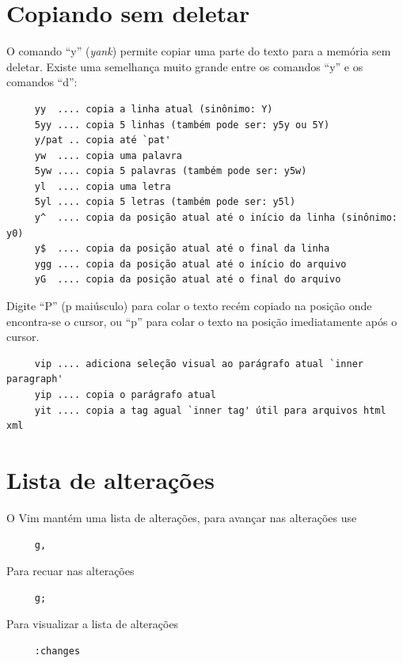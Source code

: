 \documentclass[10pt,a4paper,openany]{book}
\begin{document}
\section{Copiando sem deletar}\label{Copiando sem deletar}

O comando ``y'' ({\em yank}) permite copiar uma parte do texto para a memória sem deletar.
Existe uma semelhança muito grande entre os comandos ``y'' e os comandos ``d'':

\begin{verbatim}
     yy  .... copia a linha atual (sinônimo: Y)
     5yy .... copia 5 linhas (também pode ser: y5y ou 5Y)
     y/pat .. copia até `pat'
     yw  .... copia uma palavra
     5yw .... copia 5 palavras (também pode ser: y5w)
     yl  .... copia uma letra
     5yl .... copia 5 letras (também pode ser: y5l)
     y^  .... copia da posição atual até o início da linha (sinônimo: y0)
     y$  .... copia da posição atual até o final da linha
     ygg .... copia da posição atual até o início do arquivo
     yG  .... copia da posição atual até o final do arquivo
\end{verbatim}

Digite ``P'' (p maiúsculo) para colar o texto recém copiado na posição onde
encontra-se o cursor, ou ``p'' para colar o texto na posição imediatamente
após o cursor.

\begin{verbatim}
     vip .... adiciona seleção visual ao parágrafo atual `inner paragraph'
     yip .... copia o parágrafo atual
     yit .... copia a tag agual `inner tag' útil para arquivos html xml
\end{verbatim}

\section{Lista de alterações}
O Vim mantém uma lista de alterações, para avançar nas alterações use

\begin{verbatim}
     g,
\end{verbatim}

Para recuar nas alterações

\begin{verbatim}
     g;
\end{verbatim}

Para visualizar a lista de alterações

\begin{verbatim}
     :changes
\end{verbatim}
\end{document}
